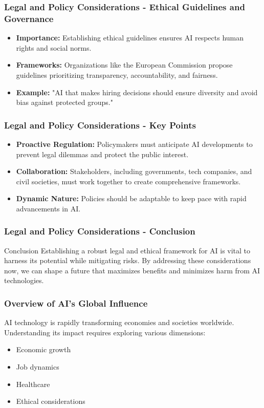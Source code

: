 \documentclass[aspectratio=169]{beamer}
\begin{document}
\begin{frame}[fragile]
    \frametitle{Legal and Policy Considerations - Ethical Guidelines and Governance}
    \begin{itemize}
        \item \textbf{Importance:} Establishing ethical guidelines ensures AI respects human rights and social norms.
        \item \textbf{Frameworks:} Organizations like the European Commission propose guidelines prioritizing transparency, accountability, and fairness.
        \item \textbf{Example:} "AI that makes hiring decisions should ensure diversity and avoid bias against protected groups."
    \end{itemize}
\end{frame}

\begin{frame}[fragile]
    \frametitle{Legal and Policy Considerations - Key Points}
    \begin{itemize}
        \item \textbf{Proactive Regulation:} Policymakers must anticipate AI developments to prevent legal dilemmas and protect the public interest.
        \item \textbf{Collaboration:} Stakeholders, including governments, tech companies, and civil societies, must work together to create comprehensive frameworks.
        \item \textbf{Dynamic Nature:} Policies should be adaptable to keep pace with rapid advancements in AI.
    \end{itemize}
\end{frame}

\begin{frame}[fragile]
    \frametitle{Legal and Policy Considerations - Conclusion}
    \begin{block}{Conclusion}
        Establishing a robust legal and ethical framework for AI is vital to harness its potential while mitigating risks. By addressing these considerations now, we can shape a future that maximizes benefits and minimizes harm from AI technologies.
    \end{block}
\end{frame}

\begin{frame}[fragile]
    \frametitle{Overview of AI's Global Influence}
    AI technology is rapidly transforming economies and societies worldwide. Understanding its impact requires exploring various dimensions:
    \begin{itemize}
        \item Economic growth
        \item Job dynamics
        \item Healthcare
        \item Ethical considerations
    \end{itemize}
\end{frame}
\end{document}
